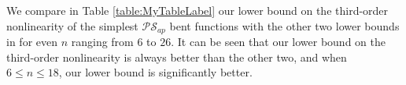 \documentclass{article}
\newcommand{\0}{\textbf{0}}
\newcommand{\1}{\textbf{1}}
\theoremstyle{plain}
\begin{document}
    \newcommand{\rb}[1]{\raisebox{1.5ex}[0pt]{#1}}
    We compare in Table \ref{table:MyTableLabel} our lower bound on the third-order nonlinearity of the simplest $\mathcal{PS}_{ap}$ bent functions with the other two lower bounds in \cite{TangCT2013NL_2bent,Carlet2011NL_Profile_Dillon} for even $n$ ranging from $6$ to $26$.
    It can be seen that our lower bound on the third-order nonlinearity is always better than the other two,
    and when $6\le n\le 18$, our lower bound is significantly better.
\end{document}
